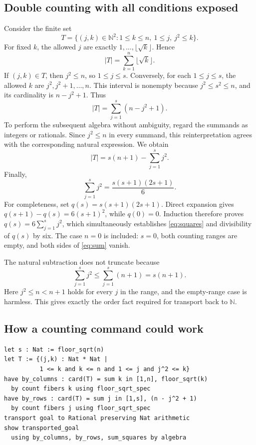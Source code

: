 \documentclass[11pt,a4paper]{article}
\newcommand{\N}{\mathbb N}
\theoremstyle{definition}
\theoremstyle{remark}
\begin{document}
\subsection{Double counting with all conditions exposed}
Consider the finite set
\[
 T=\{(j,k)\in\N^2:1\le k\le n,\ 1\le j,\ j^2\le k\}.
\]
For fixed $k$, the allowed $j$ are exactly $1,\ldots,\lfloor\sqrt k\rfloor$. Hence
\[
 |T|=\sum_{k=1}^n\lfloor\sqrt k\rfloor.
\]
If $(j,k)\in T$, then $j^2\le n$, so $1\le j\le s$. Conversely, for each $1\le j\le s$, the allowed $k$ are $j^2,j^2+1,\ldots,n$. This interval is nonempty because $j^2\le s^2\le n$, and its cardinality is $n-j^2+1$. Thus
\begin{equation}
 |T|=\sum_{j=1}^s(n-j^2+1).
 \label{eq:double-count}
\end{equation}
To perform the subsequent algebra without ambiguity, regard the summands as integers or rationals. Since $j^2\le n$ in every summand, this reinterpretation agrees with the corresponding natural expression. We obtain
\[
 |T|=s(n+1)-\sum_{j=1}^s j^2.
\]
Finally,
\begin{equation}
 \sum_{j=1}^s j^2=\frac{s(s+1)(2s+1)}6.
 \label{eq:squares}
\end{equation}
For completeness, set $q(s)=s(s+1)(2s+1)$. Direct expansion gives
$q(s+1)-q(s)=6(s+1)^2$, while $q(0)=0$. Induction therefore proves
$q(s)=6\sum_{j=1}^s j^2$, which simultaneously establishes \eqref{eq:squares} and divisibility of $q(s)$ by six. The case $n=0$ is included: $s=0$, both counting ranges are empty, and both sides of \eqref{eq:sum} vanish.

The natural subtraction does not truncate because
\[
 \sum_{j=1}^s j^2\le\sum_{j=1}^s(n+1)=s(n+1).
\]
Here $j^2\le n<n+1$ holds for every $j$ in the range, and the empty-range case is harmless. This gives exactly the order fact required for transport back to $\N$.

\subsection{How a counting command could work}
\begin{lstlisting}
let s : Nat := floor_sqrt(n)
let T := {(j,k) : Nat * Nat |
          1 <= k and k <= n and 1 <= j and j^2 <= k}
have by_columns : card(T) = sum k in [1,n], floor_sqrt(k)
  by count fibers k using floor_sqrt_spec
have by_rows : card(T) = sum j in [1,s], (n - j^2 + 1)
  by count fibers j using floor_sqrt_spec
transport goal to Rational preserving Nat arithmetic
show transported_goal
  using by_columns, by_rows, sum_squares by algebra
\end{lstlisting}
\end{document}
